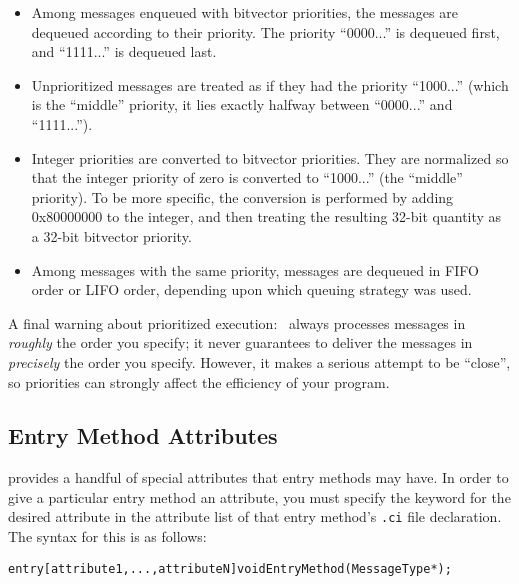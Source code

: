 \begin{itemize}

\item Among messages enqueued with bitvector priorities, the
messages are dequeued according to their priority.  The
priority ``0000...'' is dequeued first, and ``1111...'' is
dequeued last.

\item Unprioritized messages are treated as if they had the
priority ``1000...'' (which is the ``middle'' priority, it
lies exactly halfway between ``0000...'' and ``1111...'').
 
\item Integer priorities are converted to bitvector priorities.  They
are normalized so that the integer priority of zero is converted to
``1000...'' (the ``middle'' priority).  To be more specific, the
conversion is performed by adding 0x80000000 to the integer, and then
treating the resulting 32-bit quantity as a 32-bit bitvector priority.

\item Among messages with the same priority, messages are
dequeued in FIFO order or LIFO order, depending upon which
queuing strategy was used.

\end{itemize} 

A final warning about prioritized execution: \charmpp\ always processes
messages in {\it roughly} the order you specify; it never guarantees to
deliver the messages in {\it precisely} the order you specify.
However, it makes a serious attempt to be ``close'', so priorities
can strongly affect the efficiency of your program.

\subsection{Entry Method Attributes}
\label{attributes}

\charmpp{}  provides a handful of special attributes that entry methods may have.  In order to give a particular entry method an attribute, you must specify the keyword for the desired
attribute in the attribute list of that entry method's {\tt .ci} file
declaration.  The syntax for this is as follows:

\begin{alltt}
entry [attribute1, ..., attributeN] void EntryMethod(MessageType *);
\end{alltt}

